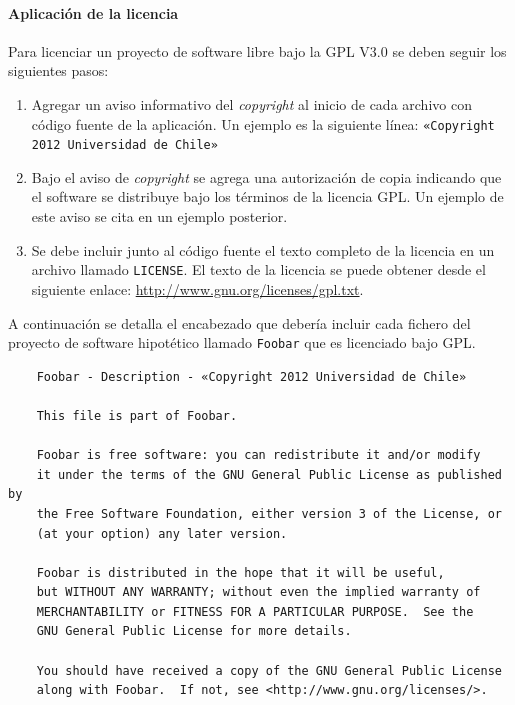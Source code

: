 \documentclass[11pt,letterpaper]{article}
\begin{document}
\paragraph{Aplicación de la licencia} Para licenciar un proyecto de software libre bajo la \ac{GPL} V3.0 se deben seguir los siguientes pasos\cite{GNU}:
\begin{enumerate}
	\item Agregar un aviso informativo del \textit{copyright} al inicio de cada archivo con código fuente de la aplicación. Un ejemplo es la siguiente línea: \texttt{«Copyright 2012 Universidad de Chile»}
	
	\item Bajo el aviso de \textit{copyright} se agrega una autorización de copia indicando que el software se distribuye bajo los términos de la licencia \ac{GPL}. Un ejemplo de este aviso se cita en un ejemplo posterior.
	
	\item Se debe incluir junto al código fuente el texto completo de la licencia en un archivo llamado \texttt{LICENSE}. El texto de la licencia se puede obtener desde el siguiente enlace: \url{http://www.gnu.org/licenses/gpl.txt}.
\end{enumerate}

A continuación se detalla el encabezado que debería incluir cada fichero del proyecto de software hipotético llamado \texttt{Foobar}  que es licenciado bajo \ac{GPL}.

\begin{verbatim}
    Foobar - Description - «Copyright 2012 Universidad de Chile»
	
    This file is part of Foobar.

    Foobar is free software: you can redistribute it and/or modify
    it under the terms of the GNU General Public License as published by
    the Free Software Foundation, either version 3 of the License, or
    (at your option) any later version.

    Foobar is distributed in the hope that it will be useful,
    but WITHOUT ANY WARRANTY; without even the implied warranty of
    MERCHANTABILITY or FITNESS FOR A PARTICULAR PURPOSE.  See the
    GNU General Public License for more details.

    You should have received a copy of the GNU General Public License
    along with Foobar.  If not, see <http://www.gnu.org/licenses/>.
\end{verbatim}
\end{document}
